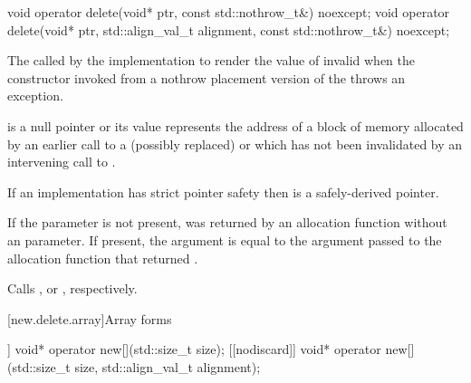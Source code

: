%
\begin{itemdecl}
void operator delete(void* ptr, const std::nothrow_t&) noexcept;
void operator delete(void* ptr, std::align_val_t alignment, const std::nothrow_t&) noexcept;
\end{itemdecl}

\begin{itemdescr}
\pnum
\effects
The
called by the implementation
to render the value of  invalid
when the constructor invoked from a nothrow
placement version of the  throws an exception.

\pnum
\replaceable
{}

\pnum
\expects
{} is a null pointer or
its value represents the address of
a block of memory allocated by
an earlier call to a (possibly replaced)
or
which has not been invalidated by an intervening call to
.

\pnum
\expects
If an implementation has strict pointer safety
then  is a safely-derived pointer.

\pnum
\expects
If the  parameter is not present,
 was returned by an allocation function
without an  parameter.
If present, the  argument
is equal to the  argument
passed to the allocation function that returned .

\pnum
{}
Calls ,
or ,
respectively.
\end{itemdescr}

[new.delete.array]{Array forms}

%
\begin{itemdecl}
[[nodiscard]] void* operator new[](std::size_t size);
[[nodiscard]] void* operator new[](std::size_t size, std::align_val_t alignment);
\end{itemdecl}

